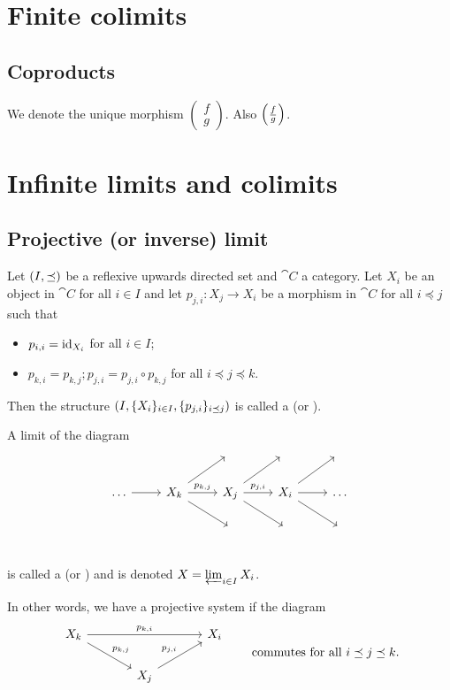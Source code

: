\section{Finite colimits}
\subsection{Coproducts}

We denote the unique morphism $\left(\begin{smallmatrix}
f \\ g
\end{smallmatrix}\right)$. Also $\coprodParallel{f}{g}$.


\section{Infinite limits and colimits}
\subsection{Projective (or inverse) limit}
\begin{definition}
Let $\left( I, \preceq \right)$ be a reflexive upwards directed set and $\cat{C}$ a category. Let $X_i$ be an object in $\cat{C}$ for all $i\in I$ and let $p_{j,i}: X_j \to X_i$ be a morphism in $\cat{C}$ for all $i \preceq j$ such that
\begin{itemize}
\item $p_{i,i} = \operatorname{id}_{X_i}$ for all $i\in I$;
\item $p_{k,i} = p_{k,j}; p_{j,i} = p_{j,i}\circ p_{k,j}$ for all $i\preceq j \preceq k$.
\end{itemize}
Then the structure $\left( I, \{X_i\}_{i\in I}, \{p_{j,i}\}_{i\preceq j} \right)$ is called a  (or ).

A limit of the diagram
\[ \begin{tikzcd}
{}&{}&{}&{}&{} \\
\hdots \ar[r] & X_k \ar[dr]\ar[ur] \ar[r, "p_{k,j}"]  & X_j \ar[dr]\ar[ur]\ar[r, "p_{j,i}"] & X_i \ar[r]\ar[dr]\ar[ur] & \hdots \\
{}&{}&{}&{}&{}\\
\end{tikzcd} \]
is called a  (or ) and is denoted $X=\varprojlim _{i\in I}{X_{i}}$.
\end{definition}
In other words, we have a projective system if the diagram
\[ \begin{tikzcd}[column sep=large]
X_k \ar[rr, "p_{k,i}"] \ar[rd, "p_{k,j}"] & & X_i \\
& X_j \ar[ur, "p_{j,i}"]
\end{tikzcd} \qquad \text{commutes for all $i\preceq j \preceq k$.} \]

